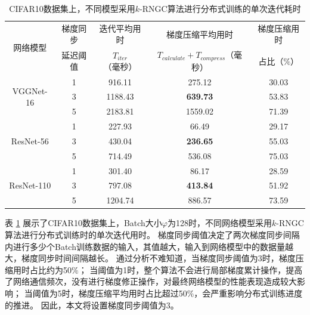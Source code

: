 \documentclass{xdupgthesis}
\begin{document}
\renewcommand{\arraystretch}{1.3}
\begin{table}[ht]
    \centering
    \begin{threeparttable}
        \caption{CIFAR10数据集上，不同模型采用$k$-RNGC算法进行分布式训练的单次迭代耗时}
        \label{tab_Result-time-contrast-2}
        \begin{tabular}{c|c|c|c|c}
            \toprule
            \toprule
            \multirow{2}{*}{网络模型} & 梯度同步 & 迭代平均用时 & 梯度压缩平均用时 & 梯度压缩用时 \\
            & 延迟阈值 & $T_{iter}$（毫秒） & $T_{calculate} + T_{compress}$（毫秒）& 占比（$\%$） \\
            \midrule
            \multirow{3}{*}{VGGNet-16} & 1 & 916.11 & 275.12 & 30.03 \\
                                        & 3 & 1188.43 & \textbf{639.73} & 53.83 \\
                                        & 5 & 2183.81 & 1559.02 & 71.39 \\
            \midrule
            \multirow{3}{*}{ResNet-56} & 1 & 227.93 & 66.49 & 29.17 \\
                                        & 3 & 430.04 & \textbf{236.65} & 55.03 \\
                                        & 5 & 714.49 & 536.08 & 75.03 \\
            \midrule
            \multirow{3}{*}{ResNet-110} & 1 & 301.40 & 86.17 & 28.59 \\
                                        & 3 & 797.08 & \textbf{413.84} & 51.92 \\
                                        & 5 & 1204.74 & 886.57 & 73.59 \\
            \bottomrule
            \bottomrule
        \end{tabular}
    \end{threeparttable}
\end{table}

表 \ref*{tab_Result-time-contrast-2} 展示了CIFAR10数据集上，Batch大小$\varphi$为128时，不同网络模型采用$k$-RNGC算法进行分布式训练时的单次迭代用时。
梯度同步阈值决定了两次梯度同步间隔内进行多少个Batch训练数据的输入，其值越大，输入到网络模型中的数据量越大，梯度同步时间间隔越长。
通过分析不难知道，当梯度同步阈值为3时，梯度压缩用时占比约为50$\%$；
当阈值为1时，整个算法不会进行局部梯度累计操作，提高了网络通信频次，没有进行梯度修正操作，对最终网络模型的性能表现造成较大影响；
当阈值为5时，梯度压缩平均用时占比超过50$\%$，会严重影响分布式训练进度的推进。
因此，本文将设置梯度同步阈值为3。
\end{document}
